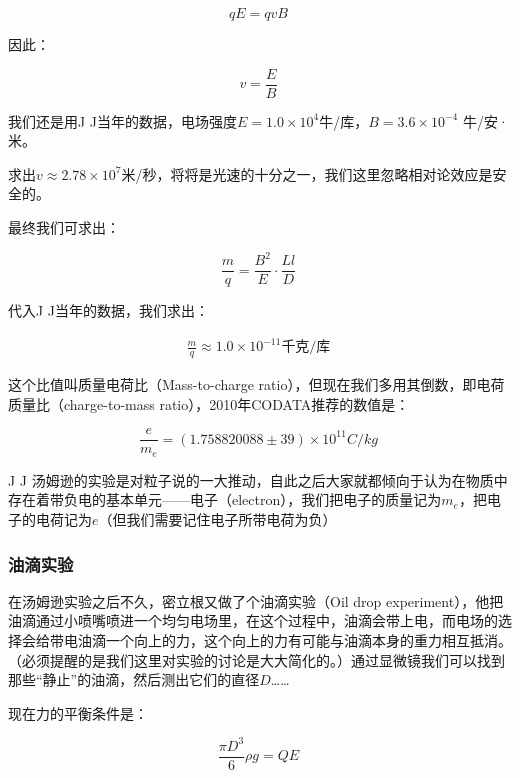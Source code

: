 \begin{equation}
q E = q v B~
\end{equation}

因此：

\begin{equation}
v = \frac{E}{B}~
\end{equation}

我们还是用J J当年的数据，电场强度$E = 1.0 \times 10^4 $牛/库，$B = 3.6 \times 10^{-4}$ 牛/安·米。

求出$v \approx 2.78 \times 10^7 $米/秒，将将是光速的十分之一，我们这里忽略相对论效应是安全的。

最终我们可求出：

\begin{equation}
\frac{m }{q } = \frac{B^2}{ E }  \cdot \frac{L l }{D}~
\end{equation}

代入J J当年的数据，我们求出：

\begin{align}
\text{$\frac{m }{q  } \approx  1.0 \times 10^{-11} $千克/库}~
\end{align}

这个比值叫质量电荷比（Mass-to-charge ratio），但现在我们多用其倒数，即电荷质量比（charge-to-mass ratio），2010年CODATA推荐的数值是：

\begin{equation}
\frac{e}{m_e} = (1.758820088 \pm 39) \times 10^{11} C/kg~
\end{equation}

J J 汤姆逊的实验是对粒子说的一大推动，自此之后大家就都倾向于认为在物质中存在着带负电的基本单元——电子（electron），我们把电子的质量记为$m_e$，把电子的电荷记为$e$（但我们需要记住电子所带电荷为负）

\subsubsection{油滴实验}

在汤姆逊实验之后不久，密立根又做了个油滴实验（Oil drop experiment），他把油滴通过小喷嘴喷进一个均匀电场里，在这个过程中，油滴会带上电，而电场的选择会给带电油滴一个向上的力，这个向上的力有可能与油滴本身的重力相互抵消。（必须提醒的是我们这里对实验的讨论是大大简化的。）通过显微镜我们可以找到那些“静止”的油滴，然后测出它们的直径$D$……

现在力的平衡条件是：

\begin{equation}
\frac{ \pi D^3 }{6} \rho g = Q E~
\end{equation}

